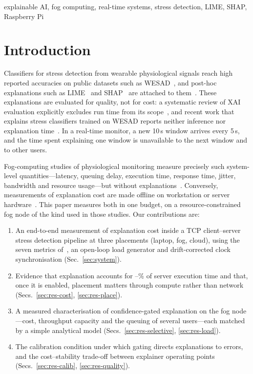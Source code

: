 \documentclass[conference]{IEEEtran}
\begin{document}
\begin{IEEEkeywords}
explainable AI, fog computing, real-time systems, stress detection, LIME,
SHAP, Raspberry Pi
\end{IEEEkeywords}

\section{Introduction}

Classifiers for stress detection from wearable physiological signals reach
high reported accuracies on public datasets such as
WESAD~\cite{schmidt2018,almadhor2025}, and post-hoc explanations such as
LIME~\cite{ribeiro2016} and SHAP~\cite{lundberg2017} are attached to
them~\cite{almadhor2025,elrashidy2025}. These explanations are evaluated
for quality, not for cost: a systematic review of XAI
evaluation explicitly excludes run time from its scope~\cite{nauta2023},
and recent work that explains stress classifiers trained on WESAD reports
neither inference nor explanation time~\cite{almadhor2025}. In a real-time
monitor, a new 10\,s window arrives every 5\,s, and
the time spent explaining one window is unavailable to the next window
and to other users.

Fog-computing studies of physiological monitoring measure precisely such
system-level quantities---latency, queuing delay, execution time, response
time, jitter, bandwidth and resource usage---but without
explanations~\cite{erzurumluoglu2025,tuli2020healthfog}. Conversely,
measurements of explanation cost are made offline on workstation or
server hardware~\cite{shats2025,warnecke2020,jethani2022}. This paper
measures both in one budget, on a resource-constrained fog node of the kind
used in those studies. Our contributions are:
\begin{enumerate}
\item An end-to-end measurement of explanation cost inside a TCP
client--server stress detection pipeline at three placements (laptop, fog, cloud), using the seven
metrics of~\cite{erzurumluoglu2025}, an open-loop load generator and
drift-corrected clock synchronisation (Sec.~\ref{sec:system}).
\item Evidence that explanation accounts for \XaiShareMin--\XaiShareMax\%
of server execution time and that, once it is enabled, placement matters
through compute rather than network (Secs.~\ref{sec:res-cost},
\ref{sec:res-place}).
\item A measured characterisation of confidence-gated explanation on the
fog node---cost, throughput capacity and the queuing of several users---each
matched by a simple analytical model (Secs.~\ref{sec:res-selective},
\ref{sec:res-load}).
\item The calibration condition under which gating directs explanations to
errors, and the cost--stability trade-off between explainer operating
points (Secs.~\ref{sec:res-calib}, \ref{sec:res-quality}).
\end{enumerate}
\end{document}
